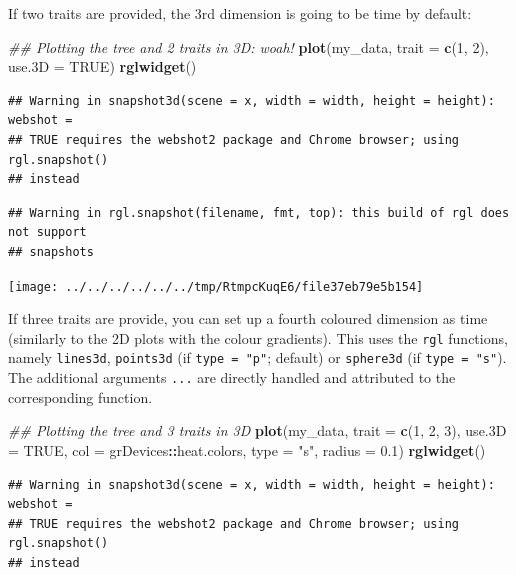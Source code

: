 \documentclass[
]{book}
\newenvironment{Shaded}{\begin{snugshade}}{\end{snugshade}}
\newcommand{\CommentTok}[1]{\textcolor[rgb]{0.56,0.35,0.01}{\textit{#1}}}
\newcommand{\DataTypeTok}[1]{\textcolor[rgb]{0.13,0.29,0.53}{#1}}
\newcommand{\DecValTok}[1]{\textcolor[rgb]{0.00,0.00,0.81}{#1}}
\newcommand{\FloatTok}[1]{\textcolor[rgb]{0.00,0.00,0.81}{#1}}
\newcommand{\KeywordTok}[1]{\textcolor[rgb]{0.13,0.29,0.53}{\textbf{#1}}}
\newcommand{\NormalTok}[1]{#1}
\newcommand{\OperatorTok}[1]{\textcolor[rgb]{0.81,0.36,0.00}{\textbf{#1}}}
\newcommand{\OtherTok}[1]{\textcolor[rgb]{0.56,0.35,0.01}{#1}}
\newcommand{\StringTok}[1]{\textcolor[rgb]{0.31,0.60,0.02}{#1}}
\begin{document}
If two traits are provided, the 3rd dimension is going to be time by default:

\begin{Shaded}
\begin{Highlighting}[]
\CommentTok{\#\# Plotting the tree and 2 traits in 3D: woah!}
\KeywordTok{plot}\NormalTok{(my\_data, }\DataTypeTok{trait =} \KeywordTok{c}\NormalTok{(}\DecValTok{1}\NormalTok{, }\DecValTok{2}\NormalTok{), }\DataTypeTok{use.3D =} \OtherTok{TRUE}\NormalTok{)}
\KeywordTok{rglwidget}\NormalTok{()}
\end{Highlighting}
\end{Shaded}

\begin{verbatim}
## Warning in snapshot3d(scene = x, width = width, height = height): webshot =
## TRUE requires the webshot2 package and Chrome browser; using rgl.snapshot()
## instead
\end{verbatim}

\begin{verbatim}
## Warning in rgl.snapshot(filename, fmt, top): this build of rgl does not support
## snapshots
\end{verbatim}

\texttt{[image: ../../../../../../tmp/RtmpcKuqE6/file37eb79e5b154]}

If three traits are provide, you can set up a fourth coloured dimension as time (similarly to the 2D plots with the colour gradients).
This uses the \texttt{rgl} functions, namely \texttt{lines3d}, \texttt{points3d} (if \texttt{type\ =\ "p"}; default) or \texttt{sphere3d} (if \texttt{type\ =\ "s"}).
The additional arguments \texttt{...} are directly handled and attributed to the corresponding function.

\begin{Shaded}
\begin{Highlighting}[]
\CommentTok{\#\# Plotting the tree and 3 traits in 3D}
\KeywordTok{plot}\NormalTok{(my\_data, }\DataTypeTok{trait =} \KeywordTok{c}\NormalTok{(}\DecValTok{1}\NormalTok{, }\DecValTok{2}\NormalTok{, }\DecValTok{3}\NormalTok{), }\DataTypeTok{use.3D =} \OtherTok{TRUE}\NormalTok{,}
     \DataTypeTok{col =}\NormalTok{ grDevices}\OperatorTok{::}\NormalTok{heat.colors, }\DataTypeTok{type =} \StringTok{"s"}\NormalTok{, }\DataTypeTok{radius =} \FloatTok{0.1}\NormalTok{)}
\KeywordTok{rglwidget}\NormalTok{()}
\end{Highlighting}
\end{Shaded}

\begin{verbatim}
## Warning in snapshot3d(scene = x, width = width, height = height): webshot =
## TRUE requires the webshot2 package and Chrome browser; using rgl.snapshot()
## instead
\end{verbatim}
\end{document}

